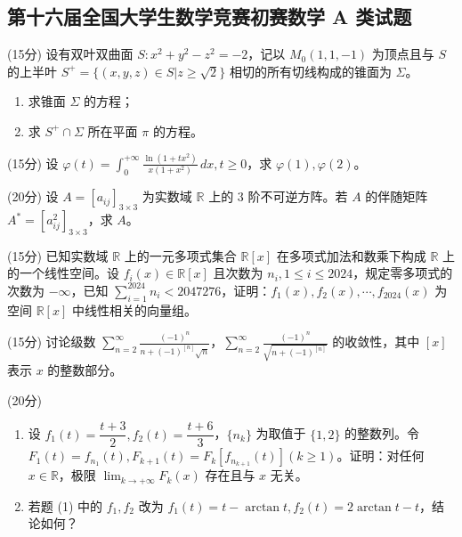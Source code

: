 \documentclass[loose]{ExBook}
\begin{document}
\subsection{第十六届全国大学生数学竞赛初赛数学 A 类试题}
\begin{qitems}

    \begin{bbox}
        \qitem (15分) 设有双叶双曲面 \( S: x^2 + y^2 - z^2 = -2 \)，记以 \( M_0(1,1,-1) \) 为顶点且与 \( S \) 的上半叶 \( S^+ = \{(x,y,z) \in S | z \geq \sqrt{2}\} \) 相切的所有切线构成的锥面为 \(\Sigma\)。
        \begin{enumerate}[label=(\arabic*)]
            \item 求锥面 \(\Sigma\) 的方程；
            \item 求 \( S^+ \cap \Sigma \) 所在平面 \(\pi\) 的方程。
        \end{enumerate}
    \end{bbox}

    \begin{bbox}
        \qitem (15分) 设 \(\varphi(t) = \int_{0}^{+\infty} \frac{\ln(1+tx^2)}{x(1+x^2)} \, dx, t \geq 0\)，求 \(\varphi(1), \varphi(2)\)。
    \end{bbox}

    \begin{bbox}
        \qitem (20分) 设 \( A = [a_{ij}]_{3 \times 3} \) 为实数域 \(\mathbb{R}\) 上的 3 阶不可逆方阵。若 \( A \) 的伴随矩阵 \( A^* = [a_{ij}^2]_{3 \times 3} \)，求 \( A \)。
    \end{bbox}

    \begin{bbox}
        \qitem (15分) 已知实数域 \(\mathbb{R}\) 上的一元多项式集合 \(\mathbb{R}[x]\) 在多项式加法和数乘下构成 \(\mathbb{R}\) 上的一个线性空间。设 \( f_i(x) \in \mathbb{R}[x] \) 且次数为 \( n_i, 1 \leq i \leq 2024 \)，规定零多项式的次数为 \( -\infty \)，已知 \(\sum_{i=1}^{2024} n_i < 2047276 \)，证明：\( f_1(x), f_2(x), \cdots, f_{2024}(x) \) 为空间 \(\mathbb{R}[x]\) 中线性相关的向量组。
    \end{bbox}

    \begin{bbox}
        \qitem (15分) 讨论级数 \(\sum_{n=2}^{\infty} \frac{(-1)^n}{n+(-1)^{[n]} \sqrt{n}}\)，\(\sum_{n=2}^{\infty} \frac{(-1)^n}{\sqrt{n+(-1)^{[n]}}}\) 的收敛性，其中 \([x]\) 表示 \( x \) 的整数部分。
    \end{bbox}

    \begin{bbox}
        \qitem (20分) 
        \begin{enumerate}[label=(\arabic*)]
            \item 设 \( f_1(t) = \dfrac{t+3}{2}, f_2(t) = \dfrac{t+6}{3} \)，\(\{n_k\}\) 为取值于 \(\{1,2\}\) 的整数列。令 \( F_1(t) = f_{n_1}(t), F_{k+1}(t) = F_k[f_{n_{k+1}}(t)](k \geq 1) \)。证明：对任何 \( x \in \mathbb{R} \)，极限 \(\lim_{k \to +\infty} F_k(x)\) 存在且与 \( x \) 无关。
            \item 若题 (1) 中的 \( f_1, f_2 \) 改为 \( f_1(t) = t - \arctan t, f_2(t) = 2 \arctan t - t \)，结论如何？
        \end{enumerate}
    \end{bbox}

\end{qitems}
\end{document}
